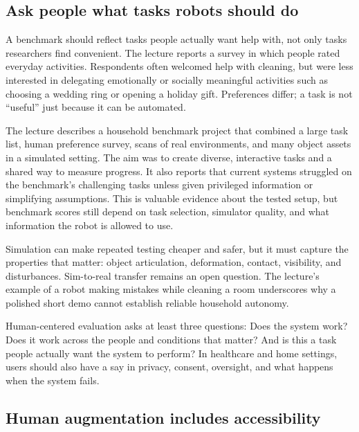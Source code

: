 \subsection{Ask people what tasks robots should do}\label{04-visual-computing-ii-ch034-ask-people-what-tasks-robots-should-do}

\hypertarget{04-visual-computing-ii-ch034-ask-people-what-tasks-robots-should-do}{}

A benchmark should reflect tasks people actually want help with, not only tasks researchers find convenient. The lecture reports a survey in which people rated everyday activities. Respondents often welcomed help with cleaning, but were less interested in delegating emotionally or socially meaningful activities such as choosing a wedding ring or opening a holiday gift. Preferences differ; a task is not ``useful'' just because it can be automated.

The lecture describes a household benchmark project that combined a large task list, human preference survey, scans of real environments, and many object assets in a simulated setting. The aim was to create diverse, interactive tasks and a shared way to measure progress. It also reports that current systems struggled on the benchmark's challenging tasks unless given privileged information or simplifying assumptions. This is valuable evidence about the tested setup, but benchmark scores still depend on task selection, simulator quality, and what information the robot is allowed to use.

Simulation can make repeated testing cheaper and safer, but it must capture the properties that matter: object articulation, deformation, contact, visibility, and disturbances. Sim-to-real transfer remains an open question. The lecture's example of a robot making mistakes while cleaning a room underscores why a polished short demo cannot establish reliable household autonomy.

Human-centered evaluation asks at least three questions: Does the system work? Does it work across the people and conditions that matter? And is this a task people actually want the system to perform? In healthcare and home settings, users should also have a say in privacy, consent, oversight, and what happens when the system fails.

\subsection{Human augmentation includes accessibility}\label{04-visual-computing-ii-ch034-human-augmentation-includes-accessibility}

